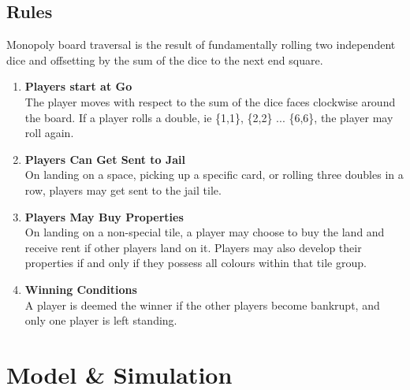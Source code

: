 \documentclass[12pt]{article}
\begin{document}
\subsection{Rules}
Monopoly board traversal is the result of fundamentally rolling two independent dice and offsetting by the sum of the dice to the next end square. 
\begin{enumerate}
  \item \textbf{Players start at Go} \hfill \\
  The player moves with respect to the sum of the dice faces clockwise around the board. If a player rolls a double, ie \{1,1\}, \{2,2\} ... \{6,6\}, the player may roll again.
  \item \textbf{Players Can Get Sent to Jail} \hfill \\
  On landing on a space, picking up a specific card, or rolling three doubles in a row, players may get sent to the jail tile.
  \item \textbf{Players May Buy Properties} \hfill \\
  On landing on a non-special tile, a player may choose to buy the land and receive rent if other players land on it. Players may also develop their properties if and only if they possess all colours within that tile group.
  \item \textbf{Winning Conditions} \hfill \\
  A player is deemed the winner if the other players become bankrupt, and only one player is left standing.
\end{enumerate}
\section{Model \& Simulation}
\end{document}
